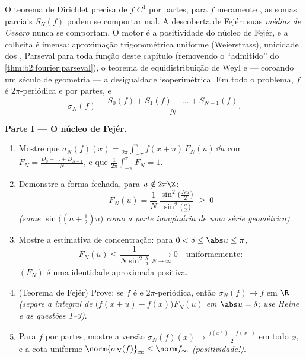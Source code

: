 \begin{problem}\label{pb:b2:fourier:1}
O teorema de Dirichlet precisa de $f$ $C^1$ por partes; para $f$ meramente
, as somas parciais $S_N(f)$ podem se comportar mal. A descoberta de
Fejér: suas \emph{médias de Cesàro} nunca se comportam. O motor é
a positividade do núcleo de Fejér, e a colheita é
imensa: aproximação trigonométrica uniforme (Weierstrass),
unicidade dos , Parseval para toda função
deste capítulo (removendo o ``admitido'' do
\cref{thm:b2:fourier:parseval}), o teorema de equidistribuição de Weyl
e --- coroando um século de geometria --- a
desigualdade isoperimétrica.
Em todo o problema, $f$ é $2\pi$-periódica e  por partes,
e
\[
\sigma_N(f) = \frac{S_0(f) + S_1(f) + \dots +
S_{N-1}(f)}{N} .
\]

\medskip
\noindent\textbf{Parte I --- O núcleo de Fejér.}
\begin{enumerate}
  \item Mostre que $\sigma_N(f)(x) =
        \frac{1}{2\pi}\int_{-\pi}^{\pi}f(x+u)\,F_N(u)\,\dd u$
        com $F_N = \frac{D_0 + \dots + D_{N-1}}{N}$, e
        que $\frac{1}{2\pi}\int_{-\pi}^{\pi}F_N = 1$.
  \item Demonstre a forma fechada, para $u \notin 2\pi\Z$:
        \[
        F_N(u) = \frac{1}{N}\,
        \frac{\sin^2\bigl(\frac{Nu}{2}\bigr)}
        {\sin^2\bigl(\frac u2\bigr)} \;\geq\; 0
        \]
        \emph{(some $\sin\bigl((n+\frac12)u\bigr)$ como a
        parte imaginária de uma série geométrica)}.
  \item Mostre a estimativa de concentração: para $0 < \delta \leq
        \abs u \leq \pi$,
        \[
        F_N(u) \leq \frac{1}{N\sin^2\frac\delta2}
        \xrightarrow[N\to\infty]{} 0
        \quad\text{uniformemente} :
        \]
        $(F_N)$ é uma identidade aproximada positiva.
  \item (Teorema de Fejér) Prove: se $f$ é  e
        $2\pi$-periódica, então $\sigma_N(f) \to f$
        \emph{} em $\R$ \emph{(separe a integral de
        $\bigl(f(x+u) - f(x)\bigr)F_N(u)$ em $\abs u =
        \delta$; use Heine e as questões 1--3)}.
  \item Para $f$  por partes, mostre a versão 
        $\sigma_N(f)(x) \to \frac{f(x^+) +
        f(x^-)}{2}$ em todo $x$, e a cota uniforme
        $\norm{\sigma_N(f)}_\infty \leq \norm f_\infty$
        \emph{(positividade!)}.
\end{enumerate}


\end{problem}
